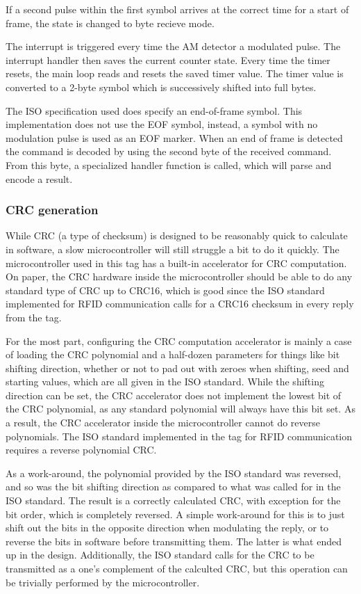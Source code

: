 If a second pulse within the first symbol arrives at the correct time for a start of frame, the state is
changed to byte recieve mode.

The interrupt is triggered every time the AM detector a modulated pulse. The interrupt handler then
saves the current counter state. Every time the timer resets, the main loop reads and resets the saved timer
value. The timer value is converted to a 2-byte symbol which is successively shifted into full bytes.

The ISO specification used does specify an end-of-frame symbol. This implementation does not use
the EOF symbol, instead, a symbol with no modulation pulse is used as an EOF marker.
When an end of frame is detected the command is decoded by using the second byte of the received command.
From this byte, a specialized handler function is called, which will parse and encode a result.


\subsubsection{CRC generation}
While CRC (a type of checksum) is designed to be reasonably quick to calculate in software,
a slow microcontroller will still struggle a bit to do it quickly. The microcontroller used in this
tag has a built-in accelerator for CRC computation. On paper, the CRC hardware inside the microcontroller
should be able to do any standard type of CRC up to CRC16, which is good since the ISO standard
implemented for RFID communication calls for a CRC16 checksum in every reply from the tag.

For the most part, configuring the CRC computation accelerator is mainly a case of loading the
CRC polynomial and a half-dozen parameters for things like bit shifting direction, whether or not to pad
out with zeroes when shifting, seed and starting values, which are all given in the ISO standard.
While the shifting direction can be set, the CRC
accelerator does not implement the lowest bit of the CRC polynomial, as any standard polynomial will always have
this bit set. As a result, the CRC accelerator inside the microcontroller cannot do reverse polynomials.
The ISO standard implemented in the tag for RFID communication requires a reverse polynomial CRC.

As a work-around, the polynomial provided by the ISO standard was reversed, and so was the bit shifting
direction as compared to what was called for in the ISO standard. The result is a correctly calculated
CRC, with exception for the bit order, which is completely reversed. A simple work-around for this is to
just shift out the bits in the opposite direction when modulating the reply, or to reverse the bits
in software before transmitting them. The latter is what ended up in the design. Additionally, the ISO standard
calls for the CRC to be transmitted as a one's complement of the calculted CRC, but this operation
can be trivially performed by the microcontroller.


